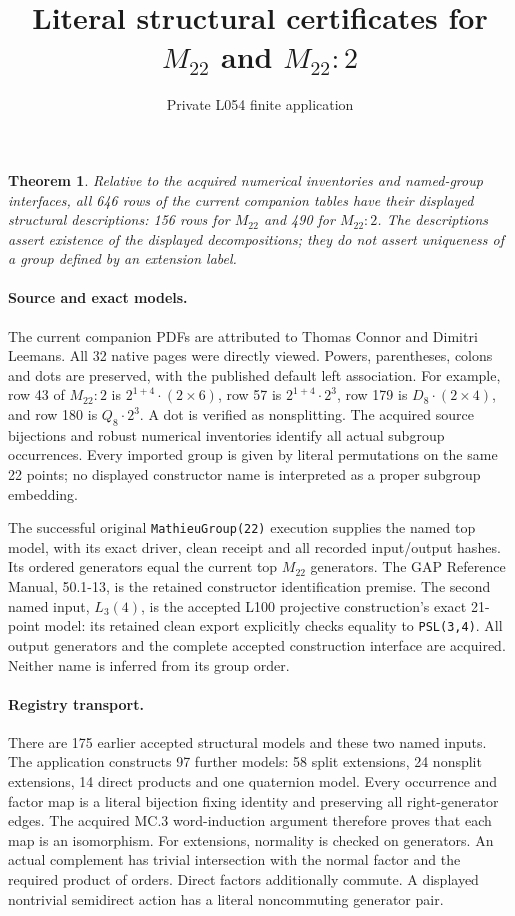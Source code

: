 \documentclass[11pt]{article}
\title{Literal structural certificates for $M_{22}$ and $M_{22}:2$}
\author{Private L054 finite application}\date{}
\newtheorem{theorem}{Theorem}\newtheorem{lemma}[theorem]{Lemma}
\begin{document}
\maketitle
\begin{theorem}
Relative to the acquired numerical inventories and named-group interfaces,
all 646 rows of the current companion tables have their displayed structural
descriptions: 156 rows for $M_{22}$ and 490 for $M_{22}:2$.
The descriptions assert existence of the displayed decompositions; they do
not assert uniqueness of a group defined by an extension label.
\end{theorem}
\paragraph{Source and exact models.}
The current companion PDFs are attributed to Thomas Connor and Dimitri
Leemans. All 32 native pages were directly viewed. Powers, parentheses,
colons and dots are preserved, with the published default left association.
For example, row 43 of $M_{22}:2$ is $2^{1+4}\mathbin{\cdot}(2\times6)$,
row 57 is $2^{1+4}\mathbin{\cdot}2^3$, row 179 is
$D_8\mathbin{\cdot}(2\times4)$, and row 180 is
$Q_8\mathbin{\cdot}2^3$. A dot is verified as nonsplitting.
The acquired source bijections and robust numerical inventories identify
all actual subgroup occurrences. Every imported group is given by literal
permutations on the same 22 points; no displayed constructor name is
interpreted as a proper subgroup embedding.

The successful original \texttt{MathieuGroup(22)} execution supplies the
named top model, with its exact driver, clean receipt and all recorded
input/output hashes. Its ordered generators equal the current top
$M_{22}$ generators. The GAP Reference Manual, 50.1-13, is the retained
constructor identification premise. The second named input, $L_3(4)$,
is the accepted L100 projective construction's exact 21-point model:
its retained clean export explicitly checks equality to \texttt{PSL(3,4)}.
All output generators and the complete accepted construction interface
are acquired. Neither name is inferred from its group order.

\paragraph{Registry transport.}
There are 175 earlier accepted structural models and these two named inputs.
The application constructs 97 further models: 58 split extensions,
24 nonsplit extensions, 14 direct products and one quaternion model.
Every occurrence and factor map is a literal bijection fixing identity and
preserving all right-generator edges. The acquired MC.3 word-induction
argument therefore proves that each map is an isomorphism.
For extensions, normality is checked on generators. An actual complement
has trivial intersection with the normal factor and the required product
of orders. Direct factors additionally commute. A displayed nontrivial
semidirect action has a literal noncommuting generator pair.
\end{document}
